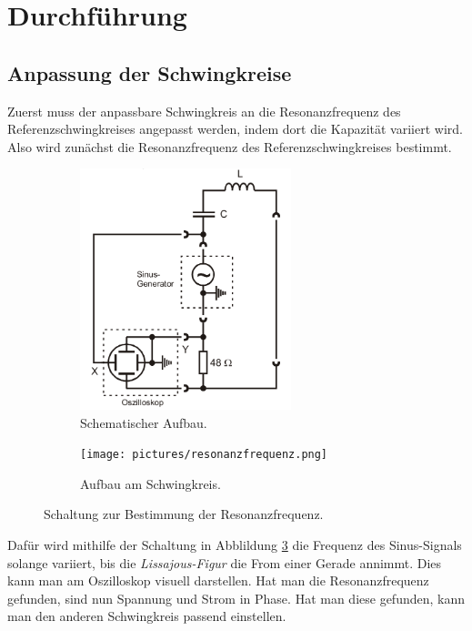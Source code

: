 \newpage
\section{Durchführung}
\label{sec:Durchführung}


\subsection{Anpassung der Schwingkreise}

Zuerst muss der anpassbare Schwingkreis an die Resonanzfrequenz des Referenzschwingkreises angepasst werden, indem dort die Kapazität variiert wird.
Also wird zunächst die Resonanzfrequenz des Referenzschwingkreises bestimmt.

\begin{figure} 
    \begin{subfigure}{0.48\textwidth}
        \includegraphics[height=7cm] {pictures/messschaltung.png} 
        \caption{Schematischer Aufbau. \cite{v355}}
        \label{fig:schema}
    \end{subfigure}
    \hfill
    \begin{subfigure}{0.48\textwidth}
        \texttt{[image: pictures/resonanzfrequenz.png]} 
        \caption{Aufbau am Schwingkreis.}
        \label{fig:foto}
    \end{subfigure}
    \caption{Schaltung zur Bestimmung der Resonanzfrequenz.}
    \label{fig:messschaltung}
\end{figure} 

Dafür wird mithilfe der Schaltung in Abblildung \ref{fig:messschaltung} die Frequenz des Sinus-Signals solange variiert,
bis die \textit{Lissajous-Figur} die From einer Gerade annimmt. Dies kann man am  Oszilloskop visuell darstellen.
Hat man die Resonanzfrequenz gefunden, sind nun Spannung und Strom in Phase.
Hat man diese gefunden, kann man den anderen Schwingkreis passend einstellen.



